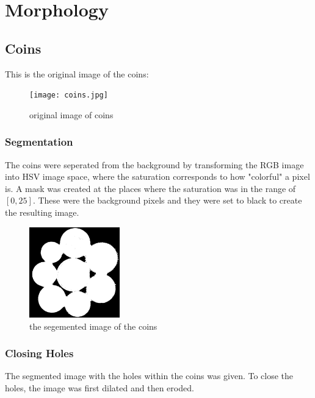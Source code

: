 \documentclass{article}
\begin{document}
    \pagebreak

    \section{Morphology}

    \subsection{Coins}

    This is the original image of the coins:

    \begin{figure}[H]
        \centering
        \texttt{[image: coins.jpg]}
        \caption{original image of coins}
        \label{fig:coins_original}
    \end{figure}

    \subsubsection{Segmentation}

    The coins were seperated from the background by transforming the RGB image into HSV image space,
    where the saturation corresponds to how "colorful" a pixel is. A mask was created at the places where the saturation was in the range of $[0, 25]$.
    These were the background pixels and they were set to black to create the resulting image.

    \begin{figure}[H]
        \centering
        \includegraphics[width = 0.35\textwidth]{coins_seg.png}
        \caption{the segemented image of the coins}
        \label{img:coins_segmented}
    \end{figure}

    \subsubsection{Closing Holes}

    The segmented image with the holes within the coins was given. To close the holes,
    the image was first dilated and then eroded.
\end{document}
